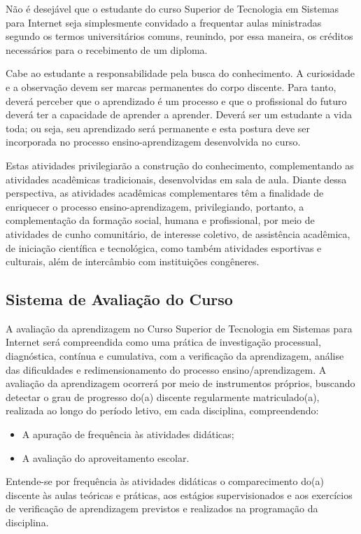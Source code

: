 	Não é desejável que o estudante do curso Superior de Tecnologia em Sistemas para Internet seja simplesmente convidado a frequentar aulas ministradas segundo os termos universitários comuns, reunindo, por essa maneira, os créditos necessários para o recebimento de um diploma.
	
	Cabe ao estudante a responsabilidade pela busca do conhecimento. A curiosidade e a observação devem ser marcas permanentes do corpo discente. Para tanto, deverá perceber que o aprendizado é um processo e que o profissional do futuro deverá ter a capacidade de aprender a aprender. Deverá ser um estudante a vida toda; ou seja, seu aprendizado será permanente e esta postura deve ser incorporada no processo ensino-aprendizagem desenvolvida no curso.
	
Estas atividades privilegiarão a construção do conhecimento, complementando as atividades acadêmicas tradicionais, desenvolvidas em sala de aula. Diante dessa perspectiva, as atividades acadêmicas complementares têm a finalidade de enriquecer o processo ensino-aprendizagem, privilegiando, portanto, a complementação da formação social, humana e profissional, por meio de atividades de cunho comunitário, de interesse coletivo, de assistência acadêmica, de iniciação científica e tecnológica, como também atividades esportivas e culturais, além de intercâmbio com instituições congêneres.

\subsection{Sistema de Avalia\c{c}\~ao do Curso}

A avaliação da aprendizagem no Curso Superior de Tecnologia em Sistemas para Internet será compreendida como uma prática de investigação processual, diagnóstica, contínua e cumulativa, com a verificação da aprendizagem, análise das dificuldades e redimensionamento do processo ensino/aprendizagem. A avaliação da aprendizagem ocorrerá por meio de instrumentos próprios, buscando detectar o grau de progresso do(a) discente regularmente matriculado(a), realizada ao longo do período letivo, em cada disciplina, compreendendo: 

\begin{itemize}
	\item A apuração de frequência às atividades didáticas;
	\item A avaliação do aproveitamento escolar.
\end{itemize}

 Entende-se por frequência às atividades didáticas o comparecimento do(a) discente às aulas teóricas e práticas, aos estágios supervisionados e aos exercícios de verificação de aprendizagem previstos e realizados na programação da disciplina. 
 
